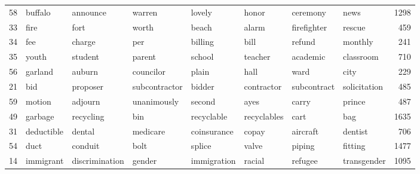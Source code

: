 \begin{table}[ht]
\begin{tabular}{rlllllllr}
   58 & \cellcolor{red!10}buffalo & \cellcolor{red!10}announce & \cellcolor{red!10}warren & \cellcolor{red!10}lovely & \cellcolor{red!10}honor & \cellcolor{red!10}ceremony & \cellcolor{red!10}news & 1298 \\ 
   33 & \cellcolor{red!10}fire & \cellcolor{red!10}fort & \cellcolor{red!10}worth & \cellcolor{red!10}beach & \cellcolor{red!10}alarm & \cellcolor{red!10}firefighter & \cellcolor{red!10}rescue & 459 \\ 
   34 & \cellcolor{red!10}fee & \cellcolor{red!10}charge & \cellcolor{red!10}per & \cellcolor{red!10}billing & \cellcolor{red!10}bill & \cellcolor{red!10}refund & \cellcolor{red!10}monthly & 241 \\ 
   35 & \cellcolor{red!10}youth & \cellcolor{red!10}student & \cellcolor{red!10}parent & \cellcolor{red!10}school & \cellcolor{red!10}teacher & \cellcolor{red!10}academic & \cellcolor{red!10}classroom & 710 \\ 
   56 & \cellcolor{red!10}garland & \cellcolor{red!10}auburn & \cellcolor{red!10}councilor & \cellcolor{red!10}plain & \cellcolor{red!10}hall & \cellcolor{red!10}ward & \cellcolor{red!10}city & 229 \\ 
   21 & \cellcolor{red!10}bid & \cellcolor{red!10}proposer & \cellcolor{red!10}subcontractor & \cellcolor{red!10}bidder & \cellcolor{red!10}contractor & \cellcolor{red!10}subcontract & \cellcolor{red!10}solicitation & 485 \\ 
   59 & \cellcolor{red!10}motion & \cellcolor{red!10}adjourn & \cellcolor{red!10}unanimously & \cellcolor{red!10}second & \cellcolor{red!10}ayes & \cellcolor{red!10}carry & \cellcolor{red!10}prince & 487 \\ 
   49 & \cellcolor{red!10}garbage & \cellcolor{red!10}recycling & \cellcolor{red!10}bin & \cellcolor{red!10}recyclable & \cellcolor{red!10}recyclables & \cellcolor{red!10}cart & \cellcolor{red!10}bag & 1635 \\ 
   31 & \cellcolor{red!10}deductible & \cellcolor{red!10}dental & \cellcolor{red!10}medicare & \cellcolor{red!10}coinsurance & \cellcolor{red!10}copay & \cellcolor{red!10}aircraft & \cellcolor{red!10}dentist & 706 \\ 
   54 & \cellcolor{red!10}duct & \cellcolor{red!10}conduit & \cellcolor{red!10}bolt & \cellcolor{red!10}splice & \cellcolor{red!10}valve & \cellcolor{red!10}piping & \cellcolor{red!10}fitting & 1477 \\ 
   14 & \cellcolor{red!10}immigrant & \cellcolor{red!10}discrimination & \cellcolor{red!10}gender & \cellcolor{red!10}immigration & \cellcolor{red!10}racial & \cellcolor{red!10}refugee & \cellcolor{red!10}transgender & 1095 \\ 

\end{tabular}
\end{table}
